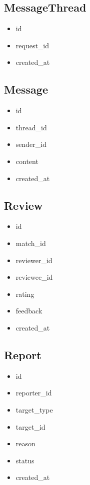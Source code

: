 \documentclass[11pt]{article}
\begin{document}
\subsection{MessageThread}
\begin{itemize}[leftmargin=1.5em]
    \item id
    \item request\_id
    \item created\_at
\end{itemize}

\subsection{Message}
\begin{itemize}[leftmargin=1.5em]
    \item id
    \item thread\_id
    \item sender\_id
    \item content
    \item created\_at
\end{itemize}

\subsection{Review}
\begin{itemize}[leftmargin=1.5em]
    \item id
    \item match\_id
    \item reviewer\_id
    \item reviewee\_id
    \item rating
    \item feedback
    \item created\_at
\end{itemize}

\subsection{Report}
\begin{itemize}[leftmargin=1.5em]
    \item id
    \item reporter\_id
    \item target\_type
    \item target\_id
    \item reason
    \item status
    \item created\_at
\end{itemize}
\end{document}
